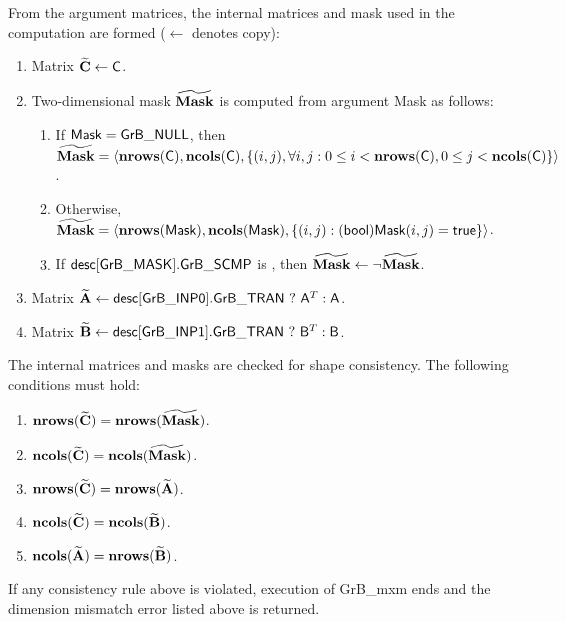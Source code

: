 From the argument matrices, the internal matrices and mask used in the computation are formed ($\leftarrow$ denotes copy):
\begin{enumerate}

	\item Matrix ${\bf \widetilde{C}} \leftarrow {\sf C}$.

	\item Two-dimensional mask ${\bf \widetilde{Mask}}$ is computed from argument {\sf Mask} as follows:
	\begin{enumerate}

		\item	If ${\sf Mask} = {\sf GrB\_NULL}$, then ${\bf \widetilde{Mask}} = \langle \bold{nrows}({\sf C}), \bold{ncols}({\sf C}), \{(i,j), \forall i,j : 0 \leq i <  \bold{nrows}({\sf C}), 0 \leq j < \bold{ncols}({\sf C}) \} \rangle$.

		\item	Otherwise, ${\bf \widetilde{Mask}} = \langle \bold{nrows}({\sf Mask}), \bold{ncols}({\sf Mask}), \{(i,j) : ({\sf bool}){\sf Mask}(i,j) = {\sf true}\} \rangle$.

		\item	If ${\sf desc[GrB\_MASK].GrB\_SCMP}$ is \true, then ${\bf \widetilde{Mask}} \leftarrow \neg {\bf \widetilde{Mask}}$.

	\end{enumerate}

	\item Matrix ${\bf \widetilde{A}} \leftarrow {\sf desc[GrB\_INP0].GrB\_TRAN} \ ? \ {\sf A}^T : {\sf A}$.

	\item Matrix ${\bf \widetilde{B}} \leftarrow {\sf desc[GrB\_INP1].GrB\_TRAN} \ ? \ {\sf B}^T : {\sf B}$.
\end{enumerate}

The internal matrices and masks are checked for shape consistency. The following conditions must hold:
\begin{enumerate}
	
	\item $\bold{nrows}({\bf \widetilde{C}}) = \bold{nrows}({\bf \widetilde{Mask}})$.

	\item $\bold{ncols}({\bf \widetilde{C}}) = \bold{ncols}({\bf \widetilde{Mask}})$.

	\item $\bold{nrows}({\bf \widetilde{C}}) = \bold{nrows}({\bf \widetilde{A}})$.

	\item $\bold{ncols}({\bf \widetilde{C}}) = \bold{ncols}({\bf \widetilde{B}})$.

	\item $\bold{ncols}({\bf \widetilde{A}}) = \bold{nrows}({\bf \widetilde{B}})$.

\end{enumerate}
If any consistency rule above is violated, execution of {\sf GrB\_mxm} ends and the dimension mismatch error listed above is returned.

